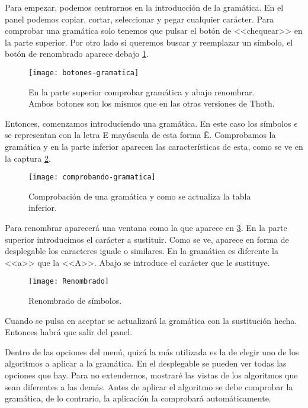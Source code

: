 Para empezar, podemos centrarnos en la introducción de la gramática. En el panel podemos copiar, cortar, seleccionar y pegar cualquier carácter. Para comprobar una gramática solo tenemos que pulsar el botón de <<chequear>> en la parte superior. Por otro lado si queremos buscar y reemplazar un símbolo, el botón de renombrado aparece debajo \ref{fig:6.5}. 

\begin{figure}[h]
\centering
\texttt{[image: botones-gramatica]}
\caption{En la parte superior comprobar gramática y abajo renombrar. Ambos botones son los mismos que en las otras versiones de Thoth.}
\label{fig:6.5}
\end{figure}

Entonces, comenzamos introduciendo una gramática. En este caso los símbolos $\epsilon$ se representan con la letra E mayúscula de esta forma Ê. Comprobamos la gramática y en la parte inferior aparecen las características de esta, como se ve en la captura \ref{fig:6.6}.  

\begin{figure}[h]
\centering
\texttt{[image: comprobando-gramatica]}
\caption{Comprobación de una gramática y como se actualiza la tabla inferior.}
\label{fig:6.6}
\end{figure}

Para renombrar aparecerá una ventana como la que aparece en \ref{fig:6.7}. En la parte superior introducimos el carácter a sustituir. Como se ve, aparece en forma de desplegable los caracteres iguale o similares. En la gramática es diferente la <<a>> que la <<A>>. Abajo se introduce el carácter que le sustituye.

\begin{figure}[h]
\centering
\texttt{[image: Renombrado]}
\caption{Renombrado de símbolos.}
\label{fig:6.7}
\end{figure}

Cuando se pulsa en aceptar se actualizará la gramática con la sustitución hecha. Entonces habrá que salir del panel.

Dentro de las opciones del menú, quizá la más utilizada es la de elegir uno de los algoritmos a aplicar a la gramática. En el desplegable se pueden ver todas las opciones que hay. Para no extendernos, mostraré las vistas de los algoritmos que sean diferentes a las demás. Antes de aplicar el algoritmo se debe comprobar la gramática, de lo contrario, la aplicación la comprobará automáticamente.

